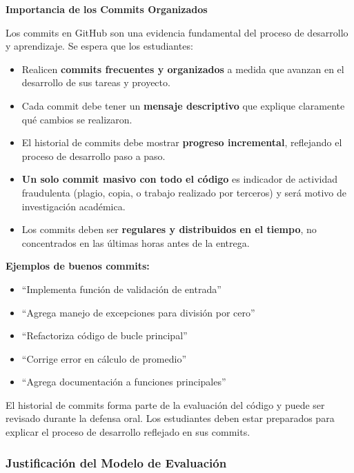 \documentclass[12pt,letterpaper]{article}
\begin{document}
\begin{notabox}
\textbf{Importancia de los Commits Organizados}

Los commits en GitHub son una evidencia fundamental del proceso de desarrollo y aprendizaje. Se espera que los estudiantes:

\begin{itemize}[leftmargin=*]
    \item Realicen \textbf{commits frecuentes y organizados} a medida que avanzan en el desarrollo de sus tareas y proyecto.
    
    \item Cada commit debe tener un \textbf{mensaje descriptivo} que explique claramente qué cambios se realizaron.
    
    \item El historial de commits debe mostrar \textbf{progreso incremental}, reflejando el proceso de desarrollo paso a paso.
    
    \item \textbf{Un solo commit masivo con todo el código} es indicador de actividad fraudulenta (plagio, copia, o trabajo realizado por terceros) y será motivo de investigación académica.
    
    \item Los commits deben ser \textbf{regulares y distribuidos en el tiempo}, no concentrados en las últimas horas antes de la entrega.
\end{itemize}

\textbf{Ejemplos de buenos commits:}
\begin{itemize}
    \item ``Implementa función de validación de entrada''
    \item ``Agrega manejo de excepciones para división por cero''
    \item ``Refactoriza código de bucle principal''
    \item ``Corrige error en cálculo de promedio''
    \item ``Agrega documentación a funciones principales''
\end{itemize}

El historial de commits forma parte de la evaluación del código y puede ser revisado durante la defensa oral. Los estudiantes deben estar preparados para explicar el proceso de desarrollo reflejado en sus commits.
\end{notabox}

\subsubsection{Justificación del Modelo de Evaluación}
\end{document}
